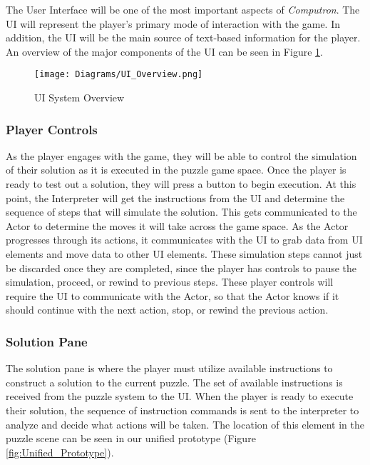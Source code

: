 The User Interface will be one of the most important aspects of \textit{Computron}. 
The UI will represent the player's primary mode of interaction with the game. In 
addition, the UI will be the main source of text-based information for the player. An 
overview of the major components of the UI can be seen in Figure \ref{fig:ui_sytem_diagram}.\\

\begin{figure}[!hb]
    \caption{UI System Overview}
    \label{fig:ui_sytem_diagram}
    \centering
    \texttt{[image: Diagrams/UI\_Overview.png]}
\end{figure}

\subsubsection{Player Controls}
As the player engages with the game, they will be able to control the simulation of 
their solution as it is executed in the puzzle game space. Once the player is ready to 
test out a solution, they will press a button to begin execution. At this point, the 
Interpreter will get the instructions from the UI and determine the sequence of steps 
that will simulate the solution. This gets communicated to the Actor to determine the 
moves it will take across the game space. As the Actor progresses through its actions, 
it communicates with the UI to grab data from UI elements and move data to other UI 
elements. These simulation steps cannot just be discarded once they are completed, 
since the player has controls to pause the simulation, proceed, or rewind to previous 
steps. These player controls will require the UI to communicate with the Actor, so that 
the Actor knows if it should continue with the next action, stop, or rewind the previous 
action.\\

\subsubsection{Solution Pane}
The solution pane is where the player must utilize available instructions to construct a 
solution to the current puzzle. The set of available instructions is received from the 
puzzle system to the UI. When the player is ready to execute their solution, the sequence 
of instruction commands is sent to the interpreter to analyze and decide what actions will 
be taken. The location of this element in the puzzle scene can be seen in our unified 
prototype (Figure \ref{fig:Unified_Prototype}).\\

